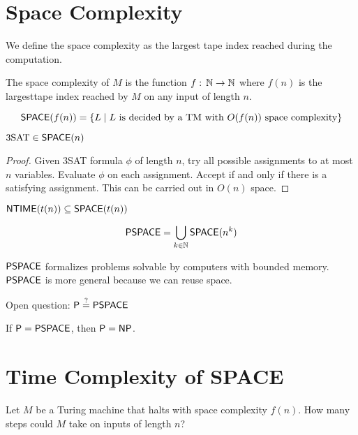 \section{Space Complexity}

We define the space complexity as the largest tape index reached during the computation.

\begin{definition}
    The space complexity of $M$ is the function $f:\, \mathbb{N} \to \mathbb{N}$ where $f(n)$ is the largesttape index reached by $M$ on any input of length $n$.
\end{definition}

\begin{definition}
     $$
     \mathsf{SPACE}(f(n)) = \{ L \mid \text{$L$ is decided by a TM with $O(f(n))$ space complexity}\}
     $$ 
\end{definition}

\begin{theorem}
    $
    \text{3SAT} \in \mathsf{SPACE}(n)
    $
\end{theorem}

\begin{proof}
    Given 3SAT formula $\phi$ of length $n$, try all possible assignments to at most $n$ variables. Evaluate $\phi$ on each assignment. Accept if and only if there is a satisfying assignment. This can be carried out in $O(n)$ space.
\end{proof}

\begin{theorem}
    $
    \mathsf{NTIME}(t(n)) \subseteq \mathsf{SPACE}(t(n))
    $
\end{theorem}

\begin{definition}[PSPACE]
    $$
    \mathsf{PSPACE} = \bigcup_{k \in \mathbb{N}} \mathsf{SPACE}(n^k)
    $$
\end{definition}

$\mathsf{PSPACE}$ formalizes problems solvable by computers with bounded memory. $\mathsf{PSPACE}$ is more general because we can reuse space.

Open question: $\mathsf{P} \overset{?}{=} \mathsf{PSPACE}$

If $\mathsf{P} = \mathsf{PSPACE}$, then $\mathsf{P} = \mathsf{NP}$. 

\section{Time Complexity of SPACE}

Let $M$ be a Turing machine that halts with space complexity $f(n)$. How many steps could $M$ take on inputs of length $n$?

